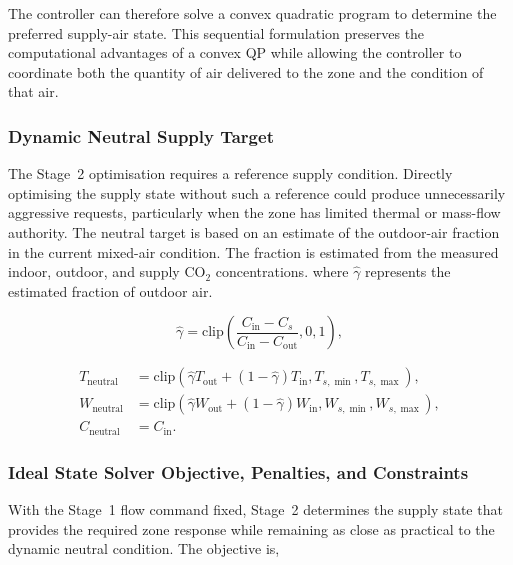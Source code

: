 \documentclass[12pt, a4paper]{article}
\begin{document}
	The controller can therefore solve a convex quadratic program to determine the preferred supply-air state. This sequential formulation preserves the computational advantages of a convex QP while allowing the controller to coordinate both the quantity of air delivered to the zone and the condition of that air.
	
	\subsubsection{Dynamic Neutral Supply Target}
	
	The Stage~2 optimisation requires a reference supply condition. Directly optimising the supply state without such a reference could produce unnecessarily aggressive requests, particularly when the zone has limited thermal or mass-flow authority. The neutral target is based on an estimate of the outdoor-air fraction in the current mixed-air condition. The fraction is estimated from the measured indoor, outdoor, and supply CO$_2$ concentrations. where $\hat{\gamma}$ represents the estimated fraction of outdoor air. 
	
	\begin{equation}
		\hat{\gamma}
		=
		\mathrm{clip}\!\left(
		\frac{C_{\mathrm{in}}-C_s}
		{C_{\mathrm{in}}-C_{\mathrm{out}}},
		0,1
		\right),
		\label{eq:gamma_estimate}
	\end{equation}

	
	\begin{align}
		T_{\mathrm{neutral}}
		&=
		\mathrm{clip}\!\left(
		\hat{\gamma}T_{\mathrm{out}}
		+
		(1-\hat{\gamma})T_{\mathrm{in}},
		T_{s,\min},T_{s,\max}
		\right),
		\\
		W_{\mathrm{neutral}}
		&=
		\mathrm{clip}\!\left(
		\hat{\gamma}W_{\mathrm{out}}
		+
		(1-\hat{\gamma})W_{\mathrm{in}},
		W_{s,\min},W_{s,\max}
		\right),
		\\
		C_{\mathrm{neutral}}
		&=C_{\mathrm{in}}.
		\label{eq:neutral_targets}
	\end{align}
	
	\subsubsection{Ideal State Solver Objective, Penalties, and Constraints}
	
	With the Stage~1 flow command fixed, Stage~2 determines the supply state that provides the required zone response while remaining as close as practical to the dynamic neutral condition. The objective is,
		
\end{document}
